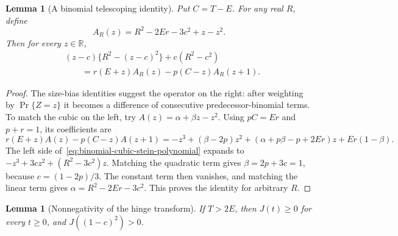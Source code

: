 \documentclass[11pt]{article}
\newtheorem{lemma}[theorem]{Lemma}
\theoremstyle{remark}
\newcommand{\R}{\mathbb R}
\begin{document}
\begin{lemma}[A binomial telescoping identity]\label{lem:binomial-stein-polynomial}
Put $C=T-E$. For any real $R$, define
\[
 A_R(z)=R^2-2Er-3c^2+z-z^2.
\]
Then for every $z\in\R$,
\begin{equation}\label{eq:binomial-cubic-stein-polynomial}
 \begin{split}
 &(z-c)\{R^2-(z-c)^2\}+c(R^2-c^2)\\
 &\hspace{2em}=r(E+z)A_R(z)-p(C-z)A_R(z+1).
 \end{split}
\end{equation}
\end{lemma}
\begin{proof}
The size-bias identities suggest the operator on the right: after weighting
by $\Pr\{Z=z\}$ it becomes a difference of consecutive predecessor-binomial
terms. To match the cubic on the left, try
$A(z)=\alpha+\beta z-z^2$. Using $pC=Er$ and $p+r=1$, its coefficients are
\[
 r(E+z)A(z)-p(C-z)A(z+1)
 =-z^3+(\beta-2p)z^2
   +(\alpha+p\beta-p+2Er)z+Er(1-\beta).
\]
The left side of~\eqref{eq:binomial-cubic-stein-polynomial} expands to
$-z^3+3cz^2+(R^2-3c^2)z$.
Matching the quadratic term gives $\beta=2p+3c=1$, because
$c=(1-2p)/3$. The constant term then vanishes, and matching the linear term
gives $\alpha=R^2-2Er-3c^2$. This proves the identity for arbitrary $R$.
\end{proof}

\begin{lemma}[Nonnegativity of the hinge transform]
\label{lem:binomial-double-cumulative}
If $T>2E$, then $J(t)\geq0$ for every $t\geq0$, and
$J((1-c)^2)>0$.
\end{lemma}
\end{document}
